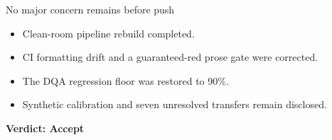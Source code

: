 \documentclass[aspectratio=169,11pt]{beamer}
\begin{document}
\begin{frame}{No major concern remains before push}
  \begin{itemize}
    \item Clean-room pipeline rebuild completed.
    \item CI formatting drift and a guaranteed-red prose gate were corrected.
    \item The DQA regression floor was restored to 90\%.
    \item Synthetic calibration and seven unresolved transfers remain disclosed.
  \end{itemize}
  \vfill
  {\LARGE\bfseries\color{Teal}Verdict: Accept}
\end{frame}
\end{document}
